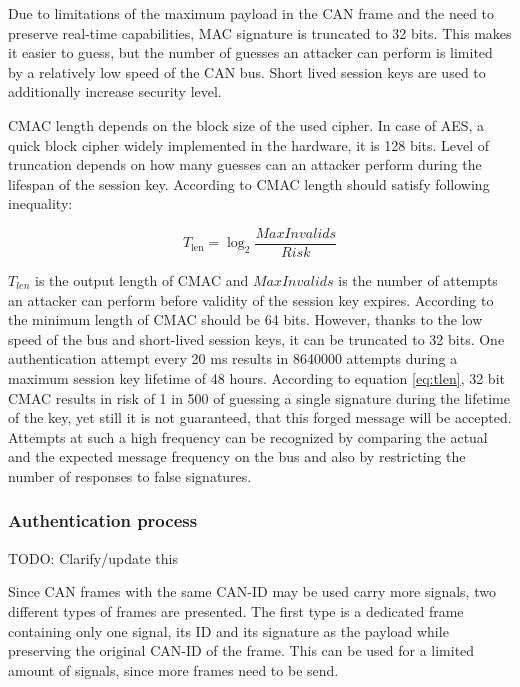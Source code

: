 \documentclass{article}
\begin{document}
Due to limitations of the maximum payload in the CAN frame and the need to preserve real-time capabilities, MAC signature is truncated to 32 bits. This makes it easier to guess, but the number of guesses an attacker can perform is limited by a relatively low speed of the CAN bus. Short lived session keys are used to additionally increase security level.

CMAC length depends on the block size of the used cipher. In case of AES, a quick block cipher widely implemented in the hardware, it is 128 bits. Level of truncation depends on how many guesses can an attacker perform during the lifespan of the session key. According to \cite{dworkin2005sp} CMAC length should satisfy following inequality:

\begin{equation} \label{eq:tlen}
T_{\text{len}} = \log_2 \frac{MaxInvalids}{Risk}
\end{equation}

$T_{len}$ is the output length of CMAC and $MaxInvalids$ is the number of attempts an attacker can perform before validity of the session key expires. According to \cite{dworkin2005sp} the minimum length of CMAC should be 64 bits. However, thanks to the low speed of the bus and short-lived session keys, it can be truncated to 32 bits. One authentication attempt every 20 ms results in 8640000 attempts during a maximum session key lifetime of 48 hours. According to equation \ref{eq:tlen}, 32 bit CMAC results in risk of 1 in 500 of guessing a single signature during the lifetime of the key, yet still it is not guaranteed, that this forged message will be accepted. Attempts at such a high frequency can be recognized by comparing the actual and the expected message frequency on the bus and also by restricting the number of responses to false signatures.

\subsubsection{Authentication process}

TODO: Clarify/update this

Since CAN frames with the same CAN-ID may be used carry more signals, two different types of frames are presented. The first type is a dedicated frame containing only one signal, its ID and its signature as the payload while preserving the original CAN-ID of the frame. This can be used for a limited amount of signals, since more frames need to be send.
\end{document}
